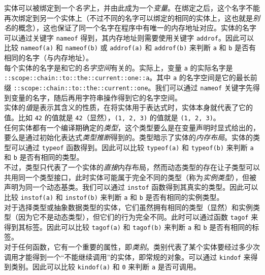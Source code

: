 实体可以被绑定到一个\emph{名字}上，并由此成为一个\emph{变量}。在绑定之后，这个名字不能再次绑定到另一个实体上（不过不同的名字可以绑定的相同的实体上，这也就是\emph{别名}的概念），这也保证了同一个名字在程序中有唯一的内存地址对应。实体的名字可以通过关键字 \lstinline!nameof! 得到，其内存地址则需要使用关键字 \lstinline!addrof!。因此可以比较 \lstinline!nameof(a)! 和 \lstinline!nameof(b)! 或 \lstinline!addrof(a)! 和 \lstinline!addrof(b)! 来判断 \lstinline!a! 和 \lstinline!b! 是否有相同的名字（与内存地址）。 \\

每个实体的名字是和它的\emph{名字空间}有关的。实际上，变量 \lstinline!a! 的实际名字是 \lstinline!::scope::chain::to::the::current::one::a!。其中 \lstinline!a! 的名字空间是它的最长前缀 \lstinline!::scope::chain::to::the::current::one!。我们可以通过 \lstinline!nameof! 关键字先得到变量的名字，随后再用字符串操作得到它的名字空间。 \\

实体的\emph{值}是表示其含义的性质，在将实体用于表达式时，实体本身就代表了它的值。比如 \lstinline!42! 的值就是 \lstinline!42!（显然），\lstinline!(1, 2, 3)! 的值就是 \lstinline!(1, 2, 3)!。 \\

任何实体都有一个编译期确定的\emph{类型}，这个类型要么是在变量声明时显式给出的，要么是通过初始化表达式\emph{类型推断}得到的。类型暗示了实体的\emph{内存布局}。实体的类型可以通过 \lstinline!typeof! 函数得到。因此可以比较 \lstinline!typeof(a)! 和 \lstinline!typeof(b)! 来判断 \lstinline!a! 和 \lstinline!b! 是否有相同的类型。 \\

不过，类型只代表了一个实体的\emph{直接}内存布局，然而动态类型的存在让子类型可以共用同一个类型接口，此时实体可能属于完全不同的类型（称为\emph{实例类型}），但被声明为同一个动态基类。我们可以通过 \lstinline!instof! 函数得到其真实的类型。因此可以比较 \lstinline!instof(a)! 和 \lstinline!instof(b)! 来判断 \lstinline!a! 和 \lstinline!b! 是否有相同的实例类型。 \\

对于选择类型或抽象数据类型的实体，它们虽然拥有相同的类型（显然）和实例类型（因为它不是动态类型），但它们的行为完全不同。此时可以通过函数 \lstinline!tagof! 来得到其标签。因此可以比较 \lstinline!tagof(a)! 和 \lstinline!tagof(b)! 来判断 \lstinline!a! 和 \lstinline!b! 是否有相同的标签。 \\

对于任何函数，它有一个重要的属性，即\emph{类别}。类别代表了某个实体要经过多少次调用才能得到一个“不能继续调用”的实体，即常规的对象。可以通过 \lstinline!kindof! 来得到类别。因此可以比较 \lstinline!kindof(a)! 和 \lstinline!0! 来判断 \lstinline!a! 是否可调用。 \\


